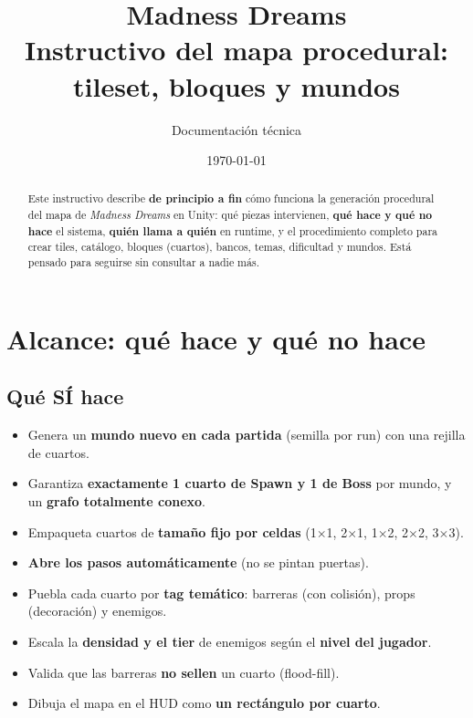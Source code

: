 \documentclass[11pt,a4paper]{article}
\title{\textbf{Madness Dreams}\\[2mm]
\large Instructivo del mapa procedural: tileset, bloques y mundos}
\author{Documentación técnica}
\date{\today}
\begin{document}
\maketitle

\begin{abstract}
\noindent
Este instructivo describe \textbf{de principio a fin} cómo funciona la generación procedural del mapa de
\emph{Madness Dreams} en Unity: qué piezas intervienen, \textbf{qué hace y qué no hace} el sistema,
\textbf{quién llama a quién} en runtime, y el procedimiento completo para crear tiles, catálogo, bloques
(cuartos), bancos, temas, dificultad y mundos. Está pensado para seguirse sin consultar a nadie más.
\end{abstract}

\tableofcontents
\newpage

\section{Alcance: qué hace y qué no hace}

\subsection*{Qué SÍ hace}
\begin{itemize}[leftmargin=1.4em]
  \item Genera un \textbf{mundo nuevo en cada partida} (semilla por run) con una rejilla de cuartos.
  \item Garantiza \textbf{exactamente 1 cuarto de Spawn y 1 de Boss} por mundo, y un \textbf{grafo totalmente conexo}.
  \item Empaqueta cuartos de \textbf{tamaño fijo por celdas} (1$\times$1, 2$\times$1, 1$\times$2, 2$\times$2, 3$\times$3).
  \item \textbf{Abre los pasos automáticamente} (no se pintan puertas).
  \item Puebla cada cuarto por \textbf{tag temático}: barreras (con colisión), props (decoración) y enemigos.
  \item Escala la \textbf{densidad y el tier} de enemigos según el \textbf{nivel del jugador}.
  \item Valida que las barreras \textbf{no sellen} un cuarto (flood-fill).
  \item Dibuja el mapa en el HUD como \textbf{un rectángulo por cuarto}.
\end{itemize}
\end{document}
